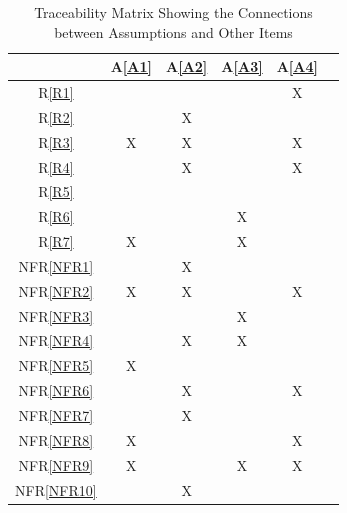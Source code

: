 \documentclass[12pt]{article}
\newcommand{\aref}[1]{A\ref{#1}}
\newcommand{\frref}[1]{R\ref{#1}}
\newcommand{\nfrref}[1]{NFR\ref{#1}}
\begin{document}
\newpage
\noindent
\begin{landscape}
\begin{table}[h!]
\centering
\begin{tabular}{|c|c|c|c|c|c}
\hline
	& \aref{A1}& \aref{A2}& \aref{A3}& \aref{A4} \\
\hline          %
\frref{R1}       &   &   &   & X  \\ \hline
\frref{R2}       &   & X&   &    \\ \hline
\frref{R3}       & X& X&   & X  \\ \hline
\frref{R4}       &   & X&   & X  \\ \hline
\frref{R5}       &   &   &   &    \\ \hline
\frref{R6}       &   &   & X&    \\ \hline
\frref{R7}       & X&   & X&     \\ \hline
\nfrref{NFR1} &   & X&   &    \\ \hline
\nfrref{NFR2} & X& X&   & X \\ \hline
\nfrref{NFR3} &   &   & X&     \\ \hline
\nfrref{NFR4} &   & X& X&     \\ \hline
\nfrref{NFR5} &   X&   &   &      \\ \hline
\nfrref{NFR6} &   &  X &   &X     \\ \hline
\nfrref{NFR7} &   &  X &   &     \\ \hline
\nfrref{NFR8} &  X &   &   &X     \\ \hline
\nfrref{NFR9} & X  &   &X  &X      \\ \hline
\nfrref{NFR10}&  & X  &   &      \\
\hline
\end{tabular}
\caption{Traceability Matrix Showing the Connections between Assumptions and Other Items}
\label{Table:A_trace}
\end{table}
\end{landscape}
\end{document}
